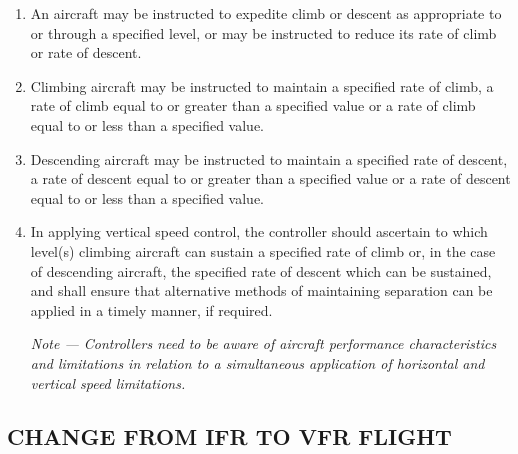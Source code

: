 \documentclass[../main.tex]{subfiles}
\begin{document}
    \begin{enumerate}
        \item An aircraft may be instructed to expedite climb or descent as appropriate to or through a specified level, or may be instructed to reduce its rate of climb or rate of descent.
        \item Climbing aircraft may be instructed to maintain a specified rate of climb, a rate of climb equal to or greater than a specified value or a rate of climb equal to or less than a specified value.
        \item Descending aircraft may be instructed to maintain a specified rate of descent, a rate of descent equal to or greater than a specified value or a rate of descent equal to or less than a specified value.
        \item In applying vertical speed control, the controller should ascertain to which level(s) climbing aircraft can sustain a specified rate of climb or, in the case of descending aircraft, the specified rate of descent which can be sustained, and shall ensure that alternative methods of maintaining separation can be applied in a timely manner, if required.

        \textit{Note --- Controllers need to be aware of aircraft performance characteristics and limitations in relation to a simultaneous application of horizontal and vertical speed limitations.}
    \end{enumerate}

    \subsection[Change from IFR to VFR flight]{CHANGE FROM IFR TO VFR FLIGHT}
\end{document}
